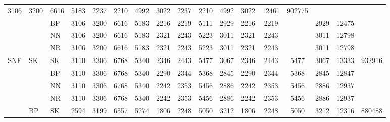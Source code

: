\documentclass[../main/main.tex]{subfiles}
\begin{document}
\begin{table}
\begin{adjustbox}{max width=\textwidth}
\begin{threeparttable}
\begin{tabular}{cllcccccccccccccc}
                3106  & 3200                    & 6616 & 5183 &
                2237  & 2210                    & 4992 & 3022 &
                2237  & 2210                    & 4992 & 3022 &
                12461 & \multirow{4}{*}{902775}
                \\
                      &      & BP   &
                3106  & 3200 & 6616 & 5183 &
                2216  & 2219 & 5111 & 2929 &
                2216  & 2219 & 5111 & 2929 &
                12475 &
                \\
                      &      & NN   &
                3106  & 3200 & 6616 & 5183 &
                2321  & 2243 & 5223 & 3011 &
                2321  & 2243 & 5223 & 3011 &
                12798 &
                \\
                      &      & NR   &
                3106  & 3200 & 6616 & 5183 &
                2321  & 2243 & 5223 & 3011 &
                2321  & 2243 & 5223 & 3011 &
                12798 &
                \\
                \midrule\midrule
                \multirow{16}[6]{*}{SNF} & \multirow{4}{*}{SK} & SK   &
                3110                     & 3306                & 6768 & 5340 &
                2346                     & 2443                & 5477 & 3067 &
                2346                     & 2443                & 5477 & 3067 &
                13333                    & \multirow{4}{*}{932916}
                \\
                       &      & BP   &
                3110   & 3306 & 6768 & 5340 &
                2290   & 2344 & 5368 & 2845 &
                2290   & 2344 & 5368 & 2845 &
                12847  &
                \\
                       &      & NN   &
                3110   & 3306 & 6768 & 5340 &
                2242   & 2353 & 5456 & 2886 &
                2242   & 2353 & 5456 & 2886 &
                12937  &
                \\
                       &      & NR   &
                3110   & 3306 & 6768 & 5340 &
                2242   & 2353 & 5456 & 2886 &
                2242   & 2353 & 5456 & 2886 &
                12937  &
                \\ \cmidrule(lr){2-17}
                       & \multirow{4}{*}{BP}     & SK   &
                2594   & 3199                    & 6557 & 5274 &
                1806   & 2248                    & 5050 & 3212 &
                1806   & 2248                    & 5050 & 3212 &
                12316  & \multirow{4}{*}{880488}

\end{tabular}
\end{threeparttable}
\end{adjustbox}
\end{table}
\end{document}
